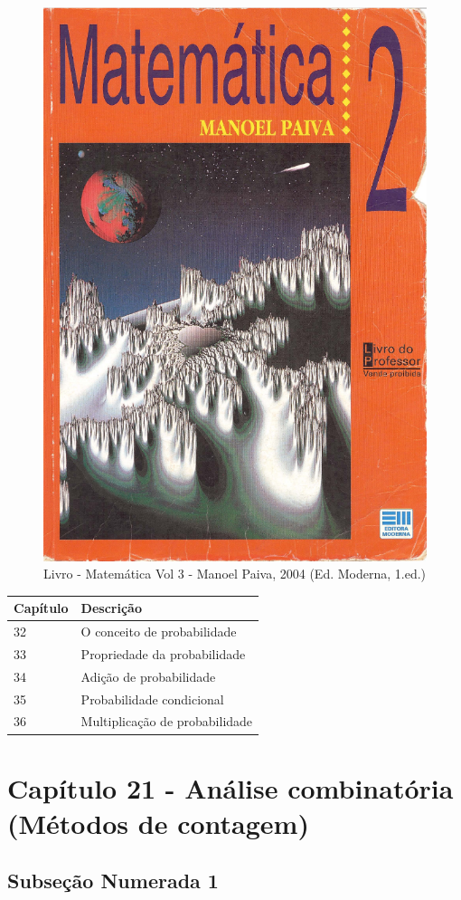 \documentclass[
]{book}
\begin{document}
\begin{figure}

{\centering \includegraphics[width=0.5\linewidth]{imagens/Capa-Livro-Matematica-Volume-2-Manoel-Paiva-2004} 

}

\caption{Livro - Matemática Vol 3 - Manoel Paiva, 2004 (Ed. Moderna, 1.ed.)}\label{fig:unnamed-chunk-9}
\end{figure}

\begin{longtable}[]{@{}ll@{}}
\toprule()
Capítulo & Descrição \\
\midrule()
\endhead
32 & O conceito de probabilidade \\
33 & Propriedade da probabilidade \\
34 & Adição de probabilidade \\
35 & Probabilidade condicional \\
36 & Multiplicação de probabilidade \\
\bottomrule()
\end{longtable}

\hypertarget{capuxedtulo-21---anuxe1lise-combinatuxf3ria-muxe9todos-de-contagem-2}{%
\section{Capítulo 21 - Análise combinatória (Métodos de contagem)}\label{capuxedtulo-21---anuxe1lise-combinatuxf3ria-muxe9todos-de-contagem-2}}

\hypertarget{subseuxe7uxe3o-numerada-1-5}{%
\subsection{Subseção Numerada 1}\label{subseuxe7uxe3o-numerada-1-5}}
\end{document}
